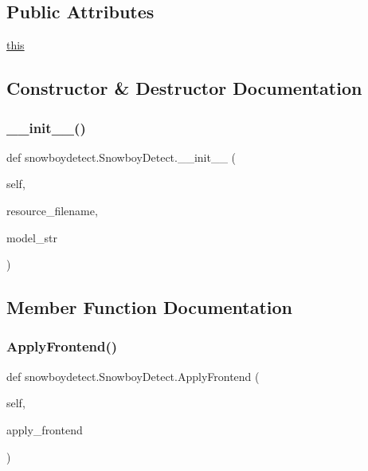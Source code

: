 \subsection*{Public Attributes}
\begin{DoxyCompactItemize}
\item 
\hyperlink{classsnowboydetect_1_1SnowboyDetect_a1259775d218033e60489f0c00eac8eea}{this}
\end{DoxyCompactItemize}


\subsection{Constructor \& Destructor Documentation}
\mbox{\label{classsnowboydetect_1_1SnowboyDetect_aacebc037562e278d600502c85a6e6240}} 
\subsubsection{\texorpdfstring{\+\_\+\+\_\+init\+\_\+\+\_\+()}{\_\_init\_\_()}}
{\footnotesize\ttfamily def snowboydetect.\+Snowboy\+Detect.\+\_\+\+\_\+init\+\_\+\+\_\+ (\begin{DoxyParamCaption}\item[{}]{self,  }\item[{}]{resource\+\_\+filename,  }\item[{}]{model\+\_\+str }\end{DoxyParamCaption})}



\subsection{Member Function Documentation}
\mbox{\label{classsnowboydetect_1_1SnowboyDetect_a4b4e6740fe532680390a8dcf3501a64a}} 
\subsubsection{\texorpdfstring{Apply\+Frontend()}{ApplyFrontend()}}
{\footnotesize\ttfamily def snowboydetect.\+Snowboy\+Detect.\+Apply\+Frontend (\begin{DoxyParamCaption}\item[{}]{self,  }\item[{}]{apply\+\_\+frontend }\end{DoxyParamCaption})}

